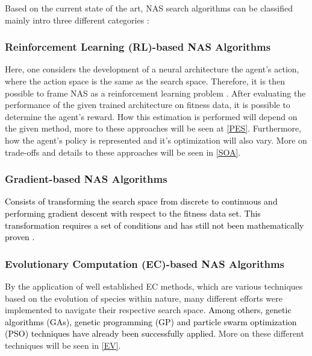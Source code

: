\documentclass[10pt,        %
               a4paper,     %
               journal,     %
               ]{IEEEtran}
\begin{document}
Based on the current state of the art, NAS search algorithms can be classified mainly intro three different
categories \cite{liu2021survey}:

\subsubsection{\textbf{Reinforcement Learning} (RL)-based NAS Algorithms}
Here, one considers the development of a neural architecture the agent's action, where the action space is the same as
the search space. Therefore, it is then possible to frame NAS as a reinforcement learning problem \cite{wistuba2019survey}.
After evaluating the performance of the given trained architecture on fitness data, it is possible to
determine the agent's reward. How this estimation is performed will depend on the given method, more to these
approaches will be seen at \ref{PES}. Furthermore, how the agent's policy is represented and it's optimization will
also vary. More on trade-offs and details to these approaches will be seen in \ref{SOA}.

\subsubsection{\textbf{Gradient}-based NAS Algorithms}
\textcolor{black}{
Consists of transforming the search space from discrete to continuous and performing
gradient descent with respect to the fitness data set. This transformation requires a set of conditions
and has still not been mathematically proven \cite{liu2021survey}.
}

\subsubsection{\textbf{Evolutionary Computation} (EC)-based NAS Algorithms}
By the application of well established EC methods, which are various techniques based on the evolution of
species within nature, many different efforts were implemented to navigate their respective search space.
\textcolor{black}{
Among others, genetic algorithms (GAs), genetic programming (GP) and particle swarm optimization (PSO)
techniques have already been successfully applied.
}
More on these different techniques will be seen in \ref{EV}.
\end{document}
